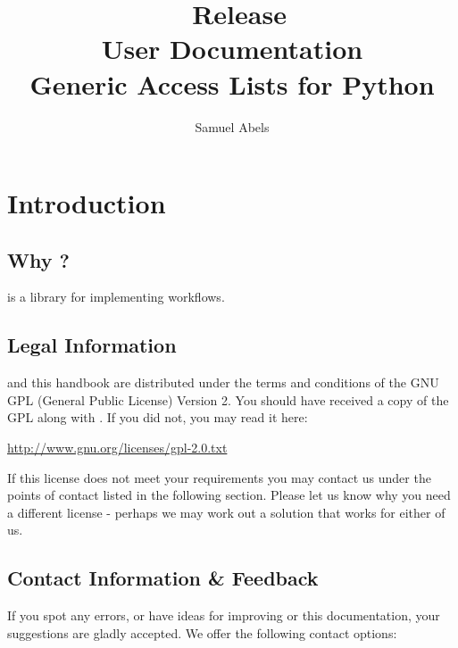 \title{\productname\ Release \productversion\\
User Documentation\\
\vspace{5 mm}
\large Generic Access Lists for Python}
\author{Samuel Abels}


\maketitle
\tableofcontents

\newpage
\section{Introduction}
\subsection{Why \productname?}

\product is a library for implementing workflows.

\subsection{Legal Information}

\product and this handbook are distributed under the terms and conditions 
of the GNU GPL (General Public License) Version 2. You should have received 
a copy of the GPL along with \product. If you did not, you may read it here:

\vspace{1em}
\url{http://www.gnu.org/licenses/gpl-2.0.txt}
\vspace{1em}

If this license does not meet your requirements you may contact us under 
the points of contact listed in the following section. Please let us know 
why you need a different license - perhaps we may work out a solution 
that works for either of us.


\subsection{Contact Information \& Feedback}

If you spot any errors, or have ideas for improving \product or this 
documentation, your suggestions are gladly accepted.
We offer the following contact options: \\

